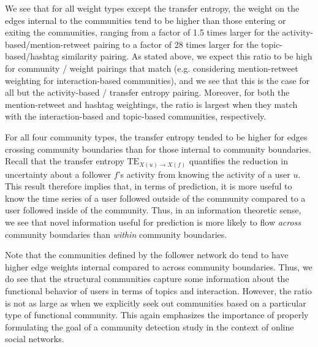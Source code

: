 We see that for all weight types except the transfer entropy, the weight on the edges internal to the communities tend to be higher than those entering or exiting the communities, ranging from a factor of 1.5 times larger for the activity-based/mention-retweet pairing to a factor of 28 times larger for the topic-based/hashtag similarity pairing. As stated above, we expect this ratio to be high for community / weight pairings that match (e.g. considering mention-retweet weighting for interaction-based communities), and we see that this is the case for all but the activity-based / transfer entropy pairing. Moreover, for both the mention-retweet and hashtag weightings, the ratio is largest when they match with the interaction-based and topic-based communities, respectively.

For all four community types, the transfer entropy tended to be higher for edges crossing community boundaries than for those internal to community boundaries. Recall that the transfer entropy $\text{TE}_{X(u) \to X(f)}$ quantifies the reduction in uncertainty about a follower $f$'s activity from knowing the activity of a user $u$. This result therefore implies that, in terms of prediction, it is more useful to know the time series of a user followed outside of the community compared to a user followed inside of the community. Thus, in an information theoretic sense, we see that novel information useful for prediction is more likely to flow \emph{across} community boundaries than \emph{within} community boundaries.

Note that the communities defined by the follower network do tend to have higher edge weights internal compared to across community boundaries. Thus, we do see that the structural communities capture some information about the functional behavior of users in terms of topics and interaction. However, the ratio is not as large as when we explicitly seek out communities based on a particular type of functional community. This again emphasizes the importance of properly formulating the goal of a community detection study in the context of online social networks.


